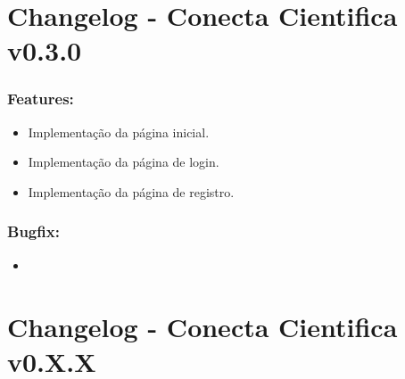 \documentclass[
40pt,				%
openright,			%
oneside,			%
a4paper,			%
chapter=TITLE,		%
sumario=tradicional,
english,			%
]{abntex2}
\begin{document}
	
	
	\frenchspacing 
	
	\pretextual
	
	\textual
	\pagestyle{meuestilo}
	
	\chapter*{Changelog - Conecta Cientifica v0.3.0} 
	
	\subsection*{\textbf{Features:}}
	\begin{itemize} \setlength\itemsep{0em}
		
		\item Implementação da página inicial.
		\item Implementação da página de login.
		\item Implementação da página de registro.

	\end{itemize}

	\subsection*{\textbf{Bugfix:}}
	\begin{itemize} \setlength\itemsep{0em}

		\item   

	\end{itemize}


	

	\chapter*{Changelog - Conecta Cientifica v0.X.X} 
	
\end{document}
